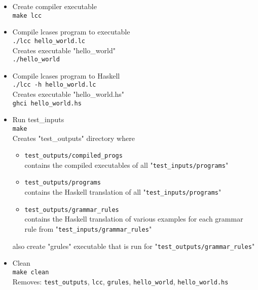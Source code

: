 \documentclass{article}
\begin{document}
\begin{itemize}
\item Create compiler executable \\

\texttt{make lcc} \\

\item Compile lcases program to executable \\

\texttt{./lcc hello_world.lc} \\

Creates executable "hello_world" \\

\texttt{./hello_world}

\item Compile lcases program to Haskell \\

\texttt{./lcc -h hello_world.lc} \\

Creates executable "hello_world.hs" \\

\texttt{ghci hello_world.hs} \\

\item Run test_inputs \\

\texttt{make} \\

Creates "test_outputs" directory where
\begin{itemize}

\item
\verb|test_outputs/compiled_progs| \\
contains the compiled executables of all "\verb|test_inputs/programs|"

\item
\verb|test_outputs/programs| \\
contains the Haskell translation of all "\verb|test_inputs/programs|"

\item
\verb|test_outputs/grammar_rules| \\
contains the Haskell translation of various examples for each grammar rule from
"\verb|test_inputs/grammar_rules|"

\end{itemize}

also create "grules" executable that is run for
"\verb|test_outputs/grammar_rules|" \\

\item Clean \\

\texttt{make clean} \\

Removes: \verb|test_outputs|, \verb|lcc|, \verb|grules|, \verb|hello_world|,
\verb|hello_world.hs|

\end{itemize}
\end{document}
